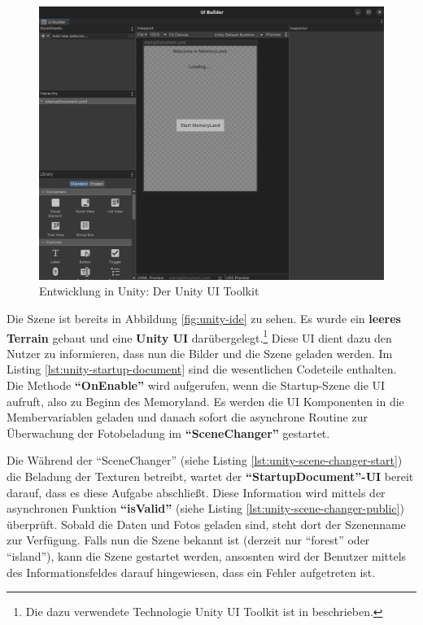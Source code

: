 \begin{figure} [h t]
    \centering
    \includegraphics[scale=0.12]{pics/unity-ui-builder.png}
    \caption{Entwicklung in Unity: Der Unity UI Toolkit}
    \label{fig:unity-ui-builder}
\end{figure}


Die Szene ist bereits in Abbildung \ref{fig:unity-ide} zu sehen. Es wurde ein \textbf{leeres Terrain} gebaut und eine \textbf{Unity UI} darübergelegt.\footnote{Die dazu verwendete Technologie Unity UI Toolkit ist in \cite{UnityDocsUIToolkit} beschrieben.} Diese UI dient dazu den Nutzer zu informieren, dass nun die Bilder und die Szene geladen werden. Im Listing \ref{lst:unity-startup-document} sind die wesentlichen Codeteile enthalten. Die Methode \textbf{``OnEnable''} wird aufgerufen, wenn die Startup-Szene die UI aufruft, also zu Beginn des Memoryland. Es werden die UI Komponenten in die Membervariablen geladen und danach sofort die asynchrone Routine zur Überwachung der Fotobeladung im \textbf{``SceneChanger''} gestartet. 


Die Während der ``SceneChanger'' (siehe Listing \ref{lst:unity-scene-changer-start}) die Beladung der Texturen betreibt, wartet der \textbf{``StartupDocument''-UI} bereit darauf, dass es diese Aufgabe abschlie\ss{}t. Diese Information wird mittels der asynchronen Funktion \textbf{``isValid''} (siehe Listing \ref{lst:unity-scene-changer-public}) überprüft. Sobald die Daten und Fotos geladen sind, steht dort der Szenenname zur Verfügung. Falls nun die Szene bekannt ist (derzeit nur ``forest'' oder ``island''), kann die Szene gestartet werden, ansosnten wird der Benutzer mittels des Informationsfeldes darauf hingewiesen, dass ein Fehler aufgetreten ist.



